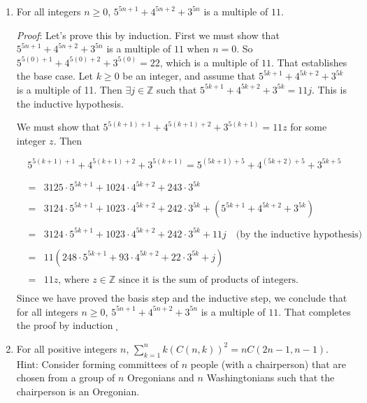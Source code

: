 \documentclass[12pt]{amsart}
\theoremstyle{definition}
\theoremstyle{remark}
\newcommand{\ints}{\mathbb Z}
\begin{document}
\begin{enumerate}
\newpage


\item For all integers $n\geq 0$, $5^{5n+1}+4^{5n+2}+3^{5n}$ is a multiple of $11$.


\bigskip
\bigskip

\emph{Proof}: Let's prove this by induction. First we must show that $5^{5n+1}+4^{5n+2}+3^{5n}$ is a multiple of $11$ when $n=0$.
So $5^{5(0)+1}+4^{5(0)+2}+3^{5(0)}=22$, which is a multiple of $11$. That establishes the base case.
Let $k\geq 0$ be an integer, and assume that $5^{5k+1}+4^{5k+2}+3^{5k}$ is a multiple of 11. 
Then $\exists j\in\ints$ such that $5^{5k+1}+4^{5k+2}+3^{5k}=11j$. This is the inductive hypothesis.

We must show that $5^{5(k+1)+1}+4^{5(k+1)+2}+3^{5(k+1)}=11z$ for some integer $z$. Then

$$5^{5(k+1)+1}+4^{5(k+1)+2}+3^{5(k+1)} = 5^{(5k+1)+5}+4^{(5k+2)+5}+3^{5k+5}$$

\begin{eqnarray*}
    &=& 3125\cdot 5^{5k+1}+1024\cdot 4^{5k+2}+243\cdot 3^{5k} \\
    \\
    &=& 3124\cdot 5^{5k+1}+1023\cdot 4^{5k+2}+242\cdot 3^{5k}+(5^{5k+1}+4^{5k+2}+3^{5k}) \\
    \\
    &=& 3124\cdot 5^{5k+1}+1023\cdot 4^{5k+2}+242\cdot 3^{5k}+11j \hspace{1em} \mbox{(by the inductive hypothesis)} \\
    \\
    &=& 11(248\cdot 5^{5k+1}+93\cdot 4^{5k+2}+22\cdot 3^{5k}+j) \\
    \\
    &=& 11z \mbox{, where } z\in\ints \mbox{ since it is the sum of products of integers. } \\
\end{eqnarray*}
Since we have proved the basis step and the inductive step, we conclude that for all integers $n\geq 0$, $5^{5n+1}+4^{5n+2}+3^{5n}$ is a multiple of $11$. 
That completes the proof by induction$\;_{\square}$\\

\newpage

\item For all positive integers $n$, $\displaystyle \sum_{k=1}^n k(C(n,k))^2=n C(2n-1,n-1)$.\\

Hint:  Consider forming committees of $n$ people (with a chairperson) that are chosen from a group of $n$ Oregonians and $n$ Washingtonians such that the chairperson is an Oregonian.

\end{enumerate}
\end{document}
